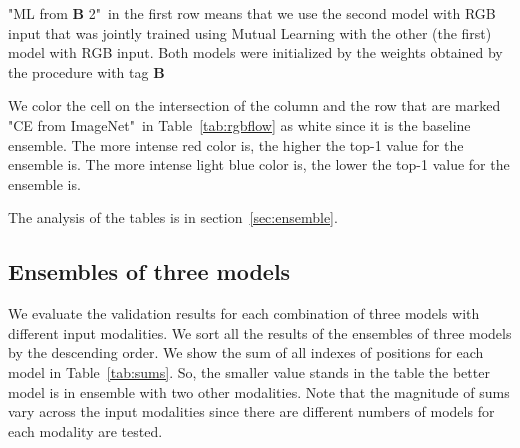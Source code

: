 \documentclass[conference]{IEEEtran}
\begin{document}
"ML from \textbf{B} 2"\ in the first row means that we use the second model with RGB input that was jointly trained using Mutual Learning with the other (the first) model with RGB input. Both models were initialized by the weights obtained by the procedure with tag \textbf{B}

We color the cell on the intersection of the column and the row that are marked "CE from ImageNet"\ in Table~\ref{tab:rgbflow} as white since it is the baseline ensemble. The more intense red color is, the higher the top-1 value for the ensemble is. The more intense light blue color is, the lower the top-1 value for the ensemble is.

The analysis of the tables is in section~\ref{sec:ensemble}.

\subsection{Ensembles of three models} \label{app:b2}

We evaluate the validation results for each combination of three models with different input modalities. We sort all the results of the ensembles of three models by the descending order. We show the sum of all indexes of positions for each model in Table~\ref{tab:sums}. So, the smaller value stands in the table the better model is in ensemble with two other modalities. Note that the magnitude of sums vary across the input modalities since there are different numbers of models for each modality are tested.
\end{document}
